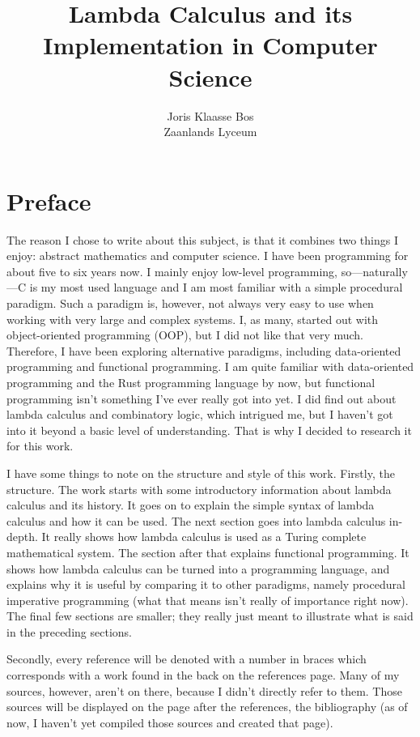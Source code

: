 \documentclass[11pt]{article}
\title{Lambda Calculus and its Implementation in Computer Science}
\author{Joris Klaasse Bos\\ Zaanlands Lyceum}
\begin{document}
\maketitle
\newpage

\section*{Preface}


The reason I chose to write about this subject, is that it combines two things
I enjoy: abstract mathematics and computer science. I have been programming for
about five to six years now. I mainly enjoy low-level programming,
so---naturally---C is my most used language and I am most familiar with a
simple procedural paradigm. Such a paradigm is, however, not always very easy
to use when working with very large and complex systems. I, as many, started
out with object-oriented programming (OOP), but I did not like that very much.
Therefore, I have been exploring alternative paradigms, including data-oriented
programming and functional programming. I am quite familiar with data-oriented
programming and the Rust programming language by now, but functional
programming isn't something I've ever really got into yet. I did find out about
lambda calculus and combinatory logic, which intrigued me, but I haven’t got
into it beyond a basic level of understanding. That is why I decided to
research it for this work. 

I have some things to note on the structure and style of this work. Firstly,
the structure. The work starts with some introductory information about lambda
calculus and its history. It goes on to explain the simple syntax of lambda
calculus and how it can be used. The next section goes into lambda calculus
in-depth. It really shows how lambda calculus is used as a Turing complete
mathematical system. The section after that explains functional programming. It
shows how lambda calculus can be turned into a programming language, and
explains why it is useful by comparing it to other paradigms, namely procedural
imperative programming (what that means isn't really of importance right now).
The final few sections are smaller; they really just meant to illustrate what
is said in the preceding sections.

Secondly, every reference will be denoted with a number in braces which
corresponds with a work found in the back on the references page. Many of my
sources, however, aren't on there, because I didn't directly refer to them.
Those sources will be displayed on the page after the references, the
bibliography (as of now, I haven't yet compiled those sources and created that
page).
\end{document}
